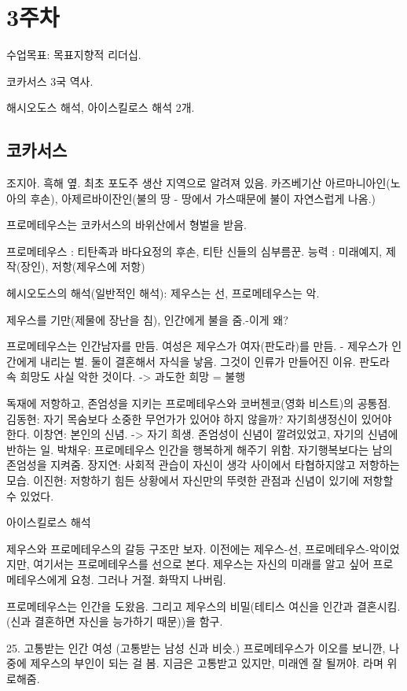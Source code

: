 \section{3주차}

수업목표: 목표지향적 리더십.

코카서스 3국 역사.

해시오도스 해석, 아이스킬로스 해석 2개.

\subsection{코카서스}
조지아. 흑해 옆. 최초 포도주 생산 지역으로 알려져 있음. 카즈베기산
아르마니아인(노아의 후손), 아제르바이잔인(불의 땅 - 땅에서 가스때문에 불이 자연스럽게 나옴.)

프로메테우스는 코카서스의 바위산에서 형벌을 받음.

프로메테우스 : 티탄족과 바다요정의 후손, 티탄 신들의 심부름꾼.
능력 : 미래예지, 제작(장인), 저항(제우스에 저항)

헤시오도스의 해석(일반적인 해석): 제우스는 선, 프로메테우스는 악.

제우스를 기만(제물에 장난을 침), 인간에게 불을 줌.-이게 왜? 

프로메테우스는 인간남자를 만듬. 여성은 제우스가 여자(판도라)를 만듬. - 제우스가 인간에게 내리는 벌.
둘이 결혼해서 자식을 낳음. 그것이 인류가 만들어진 이유.
판도라 속 희망도 사실 악한 것이다. -> 과도한 희망 = 불행

독재에 저항하고, 존엄성을 지키는 프로메테우스와 코버첸코(영화 비스트)의 공통점.
김동현: 자기 목숨보다 소중한 무언가가 있어야 하지 않을까? 자기희생정신이 있어야 한다.
이창연: 본인의 신념. -> 자기 희생. 존엄성이 신념이 깔려있었고, 자기의 신념에 반하는 일.
박채우: 프로메테우스 인간을 행복하게 해주기 위함. 자기행복보다는 남의 존엄성을 지켜줌.
장지연: 사회적 관습이 자신이 생각 사이에서 타협하지않고 저항하는 모습.
이진현: 저항하기 힘든 상황에서 자신만의 뚜렷한 관점과 신념이 있기에 저항할 수 있었다.

아이스킬로스 해석

제우스와 프로메테우스의 갈등 구조만 보자. 이전에는 제우스-선, 프로메테우스-악이었지만,
여기서는 프로메테우스를 선으로 본다. 제우스는 자신의 미래를 알고 싶어 프로메테우스에게 요청. 그러나 거절.
화딱지 나버림. 

프로메테우스는 인간을 도왔음. 그리고 제우스의 비밀(테티스 여신을 인간과
결혼시킴. (신과 결혼하면 자신을 능가하기 때문))을 함구.

25. 고통받는 인간 여성 (고통받는 남성 신과 비슷.) 
프로메테우스가 이오를 보니깐, 나중에 제우스의 부인이 되는 걸 봄.
지금은 고통받고 있지만, 미래엔 잘 될꺼야. 라며 위로해줌.


